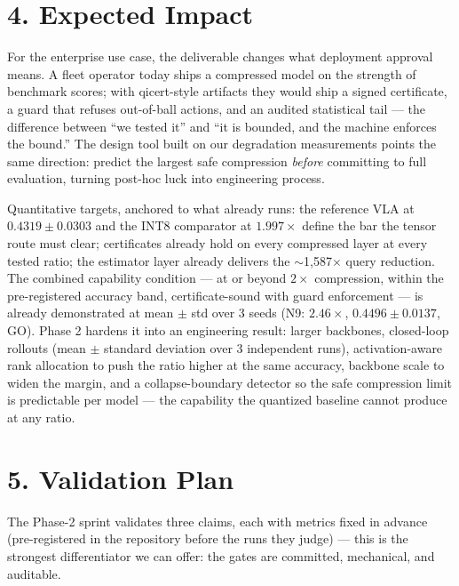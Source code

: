 \documentclass[10pt]{article}
\begin{document}
\section*{4. Expected Impact}
For the enterprise use case, the deliverable changes what deployment approval
means. A fleet operator today ships a compressed model on the strength of
benchmark scores; with qicert-style artifacts they would ship a signed
certificate, a guard that refuses out-of-ball actions, and an audited
statistical tail --- the difference between ``we tested it'' and ``it is
bounded, and the machine enforces the bound.'' The design tool built on our
degradation measurements points the same direction: predict the largest safe
compression \emph{before} committing to full evaluation, turning post-hoc
luck into engineering process.

Quantitative targets, anchored to what already runs: the reference VLA at
$0.4319 \pm 0.0303$ and the INT8 comparator at $1.997\times$ define the bar
the tensor route must clear; certificates already hold on every compressed
layer at every tested ratio; the estimator layer already delivers the
$\sim$1{,}587$\times$ query reduction. The combined capability condition
--- at or beyond $2\times$ compression, within the pre-registered accuracy
band, certificate-sound with guard enforcement --- is already demonstrated
at mean $\pm$ std over 3 seeds (N9: $2.46\times$, $0.4496 \pm 0.0137$, GO).
Phase 2 hardens it into an
engineering result: larger backbones, closed-loop rollouts (mean $\pm$ standard deviation
over 3 independent runs), activation-aware rank allocation to push the
ratio higher at the same accuracy, backbone scale to widen the margin, and
a collapse-boundary detector so the safe compression limit is predictable
per model --- the capability the quantized baseline cannot produce at any
ratio.

\section*{5. Validation Plan}
The Phase-2 sprint validates three claims, each with metrics fixed in advance
(pre-registered in the repository before the runs they judge) --- this is the
strongest differentiator we can offer: the gates are committed, mechanical,
and auditable.
\end{document}

